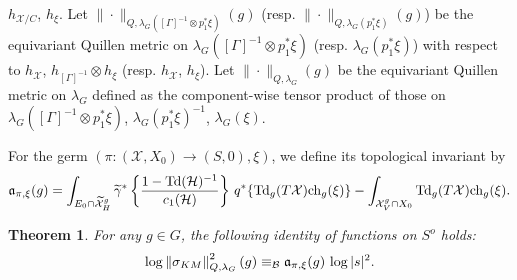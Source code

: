 \documentclass[amscd, leqno]{amsart}
\theoremstyle{plain}
\newtheorem{theorem}{Theorem}[section]
\theoremstyle{definition}
\theoremstyle{remark}
\begin{document}
$h_{{\mathcal X}/C}$, $h_{\xi}$.
Let $\|\cdot\|_{Q,\lambda_{G}([\Gamma]^{-1}\otimes p_{1}^{*}\xi)}(g)$ (resp. $\|\cdot\|_{Q,\lambda_{G}(p_{1}^{*}\xi)}(g)$) be 
the equivariant Quillen metric on $\lambda_{G}([\Gamma]^{-1}\otimes p_{1}^{*}\xi)$ (resp. $\lambda_{G}(p_{1}^{*}\xi)$) 
with respect to $h_{\mathcal X}$, $h_{[\Gamma]^{-1}}\otimes h_{\xi}$ (resp. $h_{\mathcal X}$, $h_{\xi}$).
Let $\|\cdot\|_{Q,\lambda_{G}}(g)$ be the equivariant Quillen metric on $\lambda_{G}$ defined as the component-wise tensor product of 
those on $\lambda_{G}([\Gamma]^{-1}\otimes p_{1}^{*}\xi)$, $\lambda_{G}(p_{1}^{*}\xi)^{-1}$, $\lambda_{G}(\xi)$.
\par
For the germ $(\pi\colon({\mathcal X},X_{0})\to(S,0),\xi)$, we define its topological invariant by
$$
{\frak a}_{\pi,\xi}(g)
=
\int_{E_{0}\cap\widetilde{\mathcal X}^{g}_{H}}
\widetilde{\gamma}^{*} 
\left\{ \frac{1-{\rm Td}({\mathcal H})^{-1}}{c_{1}({\mathcal H})} \right\}\, q^{*}\{ {\rm Td}_{g}(T{\mathcal X}){\rm ch}_{g}(\xi) \}
-
\int_{{\mathcal X}^{g}_{V}\cap X_{0}} {\rm Td}_{g}(T{\mathcal X}){\rm ch}_{g}(\xi).
$$


\begin{theorem}
\label{Theorem4.1}
For any $g\in G$, the following identity of functions on $S^{o}$ holds:
$$
\log \left\| \sigma_{KM} \right\|^{2}_{Q,\lambda_{G}}(g) \equiv_{\mathcal B} {\frak a}_{\pi,\xi}(g)\,\log |s|^{2}.
$$
\end{theorem}
\end{document}
